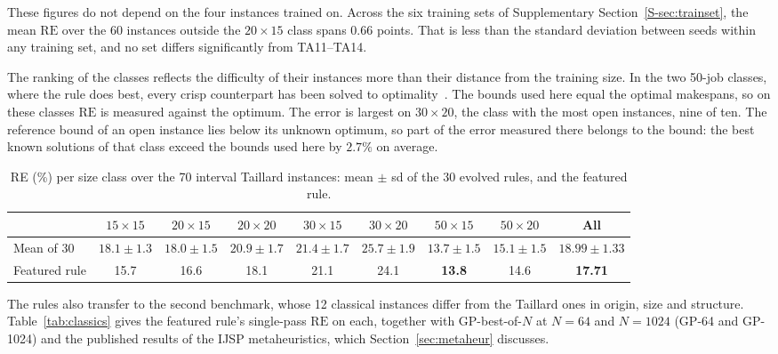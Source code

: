 \documentclass[preprint,number,sort&compress,12pt]{elsarticle}
\newcommand{\RE}{\mathrm{RE}}
\begin{document}
These figures do not depend on the four instances trained on. Across
the six training sets of Supplementary Section~\ref{S-sec:trainset},
the mean $\RE$ over the 60 instances outside the $20{\times}15$ class
spans $0.66$ points. That is less than the standard deviation between
seeds within any training set, and no set differs significantly from
TA11--TA14.

The ranking of the classes reflects the difficulty of their instances
more than their distance from the training size. In the two 50-job
classes, where the rule does best, every crisp counterpart has been
solved to optimality~\citep{CoupventdesGraviers2025}. The bounds used
here equal the optimal makespans, so on these classes $\RE$ is measured
against the optimum. The error is largest on
$30{\times}20$, the class with the most open instances, nine of ten.
The reference bound of an open instance lies below its unknown optimum,
so part of the error measured there belongs to the bound: the best known
solutions of that class exceed the bounds used here by $2.7\%$ on
average.

\begin{table}[t]
\centering\small
\caption{RE (\%) per size class over the 70 interval Taillard instances: mean
$\pm$ sd of the 30 evolved rules, and the featured rule.}
\label{tab:gp70}
\setlength{\tabcolsep}{2.2pt}
\scriptsize
\begin{tabular}{lccccccc|c}
\toprule
& $15{\times}15$ & $20{\times}15$ & $20{\times}20$ &
$30{\times}15$ & $30{\times}20$ & $50{\times}15$ & $50{\times}20$ & All \\
\midrule
Mean of 30 & $18.1{\pm}1.3$ & $18.0{\pm}1.5$ & $20.9{\pm}1.7$ &
$21.4{\pm}1.7$ & $25.7{\pm}1.9$ & $13.7{\pm}1.5$ & $15.1{\pm}1.5$ &
$18.99{\pm}1.33$ \\
Featured rule & 15.7 & 16.6 & 18.1 & 21.1 & 24.1 & \textbf{13.8} & 14.6 &
\textbf{17.71} \\
\bottomrule
\end{tabular}
\end{table}


The rules also transfer to the second benchmark, whose 12 classical
instances differ from the Taillard ones in origin, size and
structure.
Table~\ref{tab:classics} gives the featured rule's single-pass $\RE$ on
each, together with GP-best-of-$N$ at $N = 64$ and $N = 1024$ (GP-64 and
GP-1024) and the
published results of the IJSP metaheuristics, which
Section~\ref{sec:metaheur} discusses.
\end{document}
